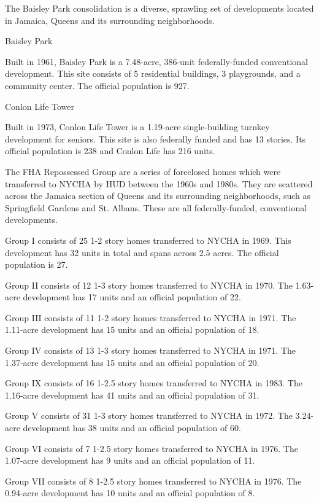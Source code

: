 

The Baisley Park consolidation is a diverse, sprawling set of developments located in Jamaica, Queens and its surrounding neighborhoods. 

Baisley Park 

Built in 1961, Baisley Park is a 7.48-acre, 386-unit federally-funded conventional development. This site consists of 5 residential buildings, 3 playgrounds, and a community center. The official population is 927. 

Conlon Life Tower 

Built in 1973, Conlon Life Tower is a 1.19-acre single-building turnkey development for seniors. This site is also federally funded and has 13 stories. Its official population is 238 and Conlon Life has 216 units. 

The FHA Repossessed Group are a series of foreclosed homes which were transferred to NYCHA by HUD between the 1960s and 1980s. They are scattered across the Jamaica section of Queens and its surrounding neighborhoods, such as Springfield Gardens and St. Albans. These are all federally-funded, conventional developments. 

Group I consists of 25 1-2 story homes transferred to NYCHA in 1969. This development has 32 units in total and spans across 2.5 acres. The official population is 27. 

Group II consists of 12 1-3 story homes transferred to NYCHA in 1970. The 1.63-acre development has 17 units and an official population of 22. 

Group III consists of 11 1-2 story homes transferred to NYCHA in 1971. The 1.11-acre development has 15 units and an official population of 18. 

Group IV consists of 13 1-3 story homes transferred to NYCHA in 1971. The 1.37-acre development has 15 units and an official population of 20. 

Group IX consists of 16 1-2.5 story homes transferred to NYCHA in 1983. The 1.16-acre development has 41 units and an official population of 31. 

Group V consists of 31 1-3 story homes transferred to NYCHA in 1972. The 3.24-acre development has 38 units and an official population of 60. 

Group VI consists of 7 1-2.5 story homes transferred to NYCHA in 1976. The 1.07-acre development has 9 units and an official population of 11. 

Group VII consists of 8 1-2.5 story homes transferred to NYCHA in 1976. The 0.94-acre development has 10 units and an official population of 8.

